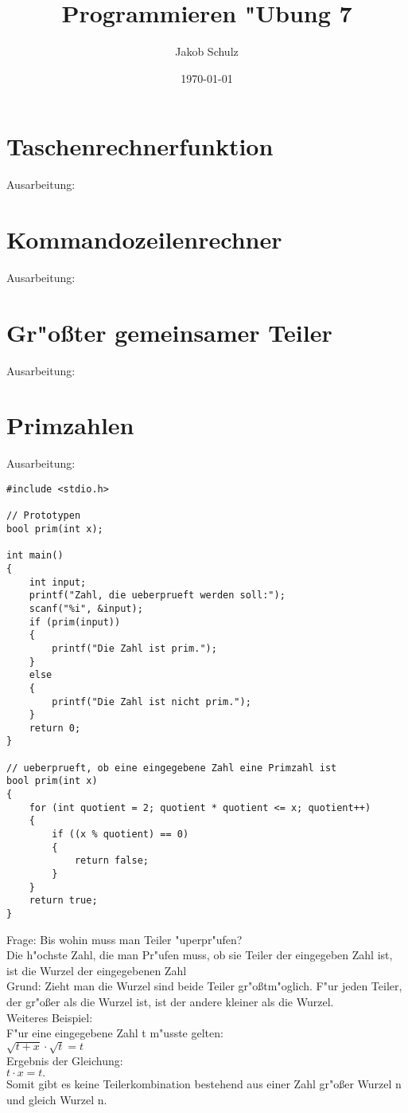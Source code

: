 \documentclass[a4paper,11pt,titlepage]{article}
\begin{document}
\title{Programmieren "Ubung 7}


\author{Jakob Schulz}


\date{\today}

\maketitle{\thispagestyle{plain}}

\section{Taschenrechnerfunktion}
Ausarbeitung:
\newpage
\section{Kommandozeilenrechner}
Ausarbeitung:
\newpage
\section{Gr"oßter gemeinsamer Teiler}
Ausarbeitung:
\newpage
\section{Primzahlen}
Ausarbeitung:
\begin{lstlisting}[style = c++]
#include <stdio.h>

// Prototypen
bool prim(int x);

int main()
{
    int input;
    printf("Zahl, die ueberprueft werden soll:");
    scanf("%i", &input);
    if (prim(input))
    {
        printf("Die Zahl ist prim.");
    }
    else
    {
        printf("Die Zahl ist nicht prim.");
    }
    return 0;
}

// ueberprueft, ob eine eingegebene Zahl eine Primzahl ist
bool prim(int x)
{
    for (int quotient = 2; quotient * quotient <= x; quotient++)
    {
        if ((x % quotient) == 0)
        {
            return false;
        }
    }
    return true;
}
\end{lstlisting}
Frage: Bis wohin muss man Teiler "uperpr"ufen?\\
Die h"ochste Zahl, die man Pr"ufen muss, ob sie Teiler der eingegeben Zahl ist, ist die Wurzel der eingegebenen Zahl\\
Grund: Zieht man die Wurzel sind beide Teiler gr"oßtm"oglich. F"ur jeden Teiler, der gr"oßer als die Wurzel ist, ist der andere kleiner als die Wurzel.\\
Weiteres Beispiel:\\
F"ur eine eingegebene Zahl t m"usste gelten:\\
$\sqrt{t+x}\cdot \sqrt{t} = t$\\
Ergebnis der Gleichung:\\
$t\cdot x = t.$\\
Somit gibt es keine Teilerkombination bestehend aus einer Zahl gr"oßer Wurzel n und gleich Wurzel n.
\end{document}
